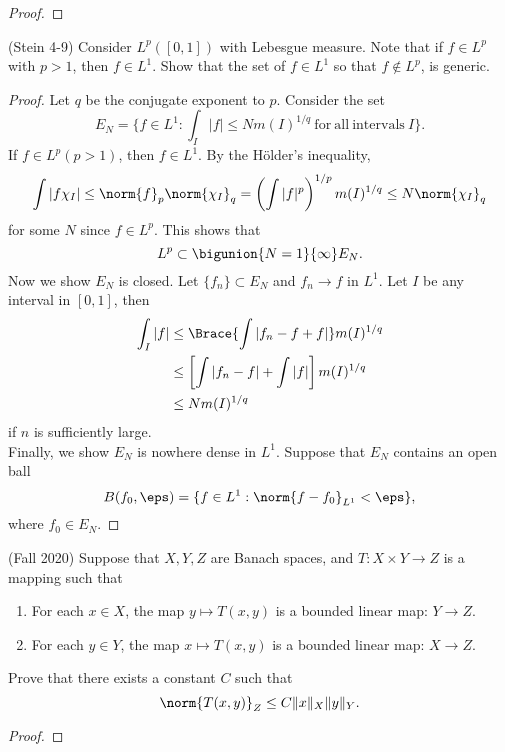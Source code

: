 \begin{problemset}
\begin{proof}
\end{proof}

\item (Stein 4-9) Consider $L^p([0,1])$ with Lebesgue measure. Note that if $f \in L^p$ with $p>1$, then $f \in L^1$. Show that the set of $f \in L^1$ so that $f \notin L^p$, is generic. 
\begin{proof}
    Let $q$ be the conjugate exponent to $p$. 
    Consider the set 
    $$E_N=\{f \in L^1: \int_I |f| \leq Nm(I)^{1/q}~\mathrm{for~all~intervals~}I\}.$$ 
    If $f \in L^p(p>1)$, then $f \in L^1$. By the H\"older's inequality,
    $$\int |f\chi_{I}| \leq \norm{f}_p \norm{\chi_{I}}_q 
       = \left( \int|f|^p \right)^{1/p} m(I)^{1/q} \leq N\norm{\chi_{I}}_q $$
    for some $N$ since $f \in L^p$. This shows that 
    $$L^p \subset \bigunion{N=1}{\infty}E_N.$$
    Now we show $E_N$ is closed. 
    Let $\{f_n\} \subset E_N$ and $f_n \to f$ in $L^1$. Let $I$ be any interval in $[0,1]$, then 
    \begin{align*}
    \int_I |f| &\leq \Brace{\int|f_n-f+f|}m(I)^{1/q} \\
               &\leq \left[ \int|f_n-f|+\int|f| \right]m(I)^{1/q} \\
               &\leq Nm(I)^{1/q}
    \end{align*}
    if $n$ is sufficiently large. \\
    Finally, we show $E_N$ is nowhere dense in $L^1$. Suppose that $E_N$ contains an open ball
    $$B(f_0, \eps) = \{f \in L^1: \norm{f-f_0}_{L^1}<\eps\},$$ where $f_0 \in E_N$. 
\end{proof}

\item (Fall 2020)
Suppose that $X, Y, Z$ are Banach spaces, and $T:X \times Y \to Z$ is a mapping such that
\begin{enumerate}
    \item For each $x \in X$, the map $y \mapsto T(x,y)$ is a bounded linear map: $Y \to Z$.
    \item For each $y \in Y$, the map $x \mapsto T(x,y)$ is a bounded linear map: $X \to Z$.
\end{enumerate}
Prove that there exists a constant $C$ such that 
$$\norm{T(x,y)}_Z \leq C\|x\|_X \|y\|_Y.$$
\begin{proof}
    
\end{proof}
\end{problemset}
